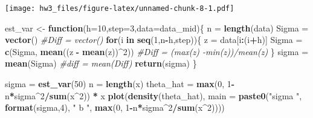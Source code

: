 \documentclass[]{article}
\newenvironment{Shaded}{\begin{snugshade}}{\end{snugshade}}
\newcommand{\KeywordTok}[1]{\textcolor[rgb]{0.13,0.29,0.53}{\textbf{#1}}}
\newcommand{\DataTypeTok}[1]{\textcolor[rgb]{0.13,0.29,0.53}{#1}}
\newcommand{\DecValTok}[1]{\textcolor[rgb]{0.00,0.00,0.81}{#1}}
\newcommand{\StringTok}[1]{\textcolor[rgb]{0.31,0.60,0.02}{#1}}
\newcommand{\CommentTok}[1]{\textcolor[rgb]{0.56,0.35,0.01}{\textit{#1}}}
\newcommand{\ControlFlowTok}[1]{\textcolor[rgb]{0.13,0.29,0.53}{\textbf{#1}}}
\newcommand{\OperatorTok}[1]{\textcolor[rgb]{0.81,0.36,0.00}{\textbf{#1}}}
\newcommand{\NormalTok}[1]{#1}
\begin{document}
\texttt{[image: hw3\_files/figure-latex/unnamed-chunk-8-1.pdf]}

\begin{Shaded}
\begin{Highlighting}[]
\NormalTok{est_var <-}\StringTok{ }\ControlFlowTok{function}\NormalTok{(}\DataTypeTok{h=}\DecValTok{10}\NormalTok{,}\DataTypeTok{step=}\DecValTok{3}\NormalTok{,}\DataTypeTok{data=}\NormalTok{data_mid)\{}
\NormalTok{  n =}\StringTok{ }\KeywordTok{length}\NormalTok{(data)}
\NormalTok{  Sigma =}\StringTok{ }\KeywordTok{vector}\NormalTok{()}
  \CommentTok{#Diff = vector()}
  \ControlFlowTok{for}\NormalTok{(i }\ControlFlowTok{in} \KeywordTok{seq}\NormalTok{(}\DecValTok{1}\NormalTok{,n}\OperatorTok{-}\NormalTok{h,step))\{}
\NormalTok{    z =}\StringTok{ }\NormalTok{data[i}\OperatorTok{:}\NormalTok{(i}\OperatorTok{+}\NormalTok{h)]}
\NormalTok{    Sigma =}\StringTok{ }\KeywordTok{c}\NormalTok{(Sigma, }\KeywordTok{mean}\NormalTok{((z }\OperatorTok{-}\StringTok{ }\KeywordTok{mean}\NormalTok{(z))}\OperatorTok{^}\DecValTok{2}\NormalTok{))}
    \CommentTok{#Diff = (max(z) -min(z))/mean(z)}
\NormalTok{  \}}
\NormalTok{  sigma =}\StringTok{ }\KeywordTok{mean}\NormalTok{(Sigma)}
  \CommentTok{#diff = mean(Diff)}
  \KeywordTok{return}\NormalTok{(sigma)}
\NormalTok{\}}
\end{Highlighting}
\end{Shaded}

\begin{Shaded}
\begin{Highlighting}[]
\NormalTok{sigma =}\StringTok{ }\KeywordTok{est_var}\NormalTok{(}\DecValTok{50}\NormalTok{)}
\NormalTok{n =}\StringTok{ }\KeywordTok{length}\NormalTok{(x)}
\NormalTok{theta_hat =}\StringTok{ }\KeywordTok{max}\NormalTok{(}\DecValTok{0}\NormalTok{, }\DecValTok{1}\OperatorTok{-}\NormalTok{n}\OperatorTok{*}\NormalTok{sigma}\OperatorTok{^}\DecValTok{2}\OperatorTok{/}\KeywordTok{sum}\NormalTok{(x}\OperatorTok{^}\DecValTok{2}\NormalTok{)) }\OperatorTok{*}\StringTok{ }\NormalTok{x}
\KeywordTok{plot}\NormalTok{(}\KeywordTok{density}\NormalTok{(theta_hat), }\DataTypeTok{main =} \KeywordTok{paste0}\NormalTok{(}\StringTok{"sigma "}\NormalTok{, }\KeywordTok{format}\NormalTok{(sigma,}\DecValTok{4}\NormalTok{), }\StringTok{" b "}\NormalTok{, }\KeywordTok{max}\NormalTok{(}\DecValTok{0}\NormalTok{, }\DecValTok{1}\OperatorTok{-}\NormalTok{n}\OperatorTok{*}\NormalTok{sigma}\OperatorTok{^}\DecValTok{2}\OperatorTok{/}\KeywordTok{sum}\NormalTok{(x}\OperatorTok{^}\DecValTok{2}\NormalTok{))))}
\end{Highlighting}
\end{Shaded}
\end{document}
